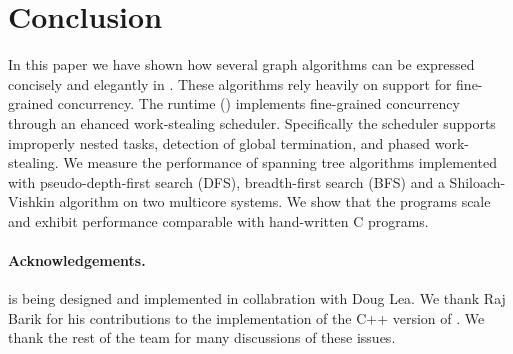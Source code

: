 \section{Conclusion}\label{s:concl}

In this paper we have shown how several graph algorithms can be
expressed concisely and elegantly in \Xten. These algorithms rely
heavily on support for fine-grained concurrency. The \Xten{} runtime
(\XWS) implements fine-grained concurrency through an ehanced
work-stealing scheduler. Specifically the scheduler supports
improperly nested tasks, detection of global termination, and phased
work-stealing.  We measure the performance of spanning tree algorithms
implemented with pseudo-depth-first search (DFS), breadth-first search
(BFS) and a Shiloach-Vishkin algorithm on two multicore systems. We
show that the \XWS{} programs scale and exhibit performance comparable
with hand-written C programs.

\paragraph{Acknowledgements.} \XWS{} is being designed and implemented in collabration with Doug Lea. We thank Raj Barik for his contributions to the implementation of the C++ version of \XWS. We thank the rest of the \Xten{} team for many discussions of these issues.